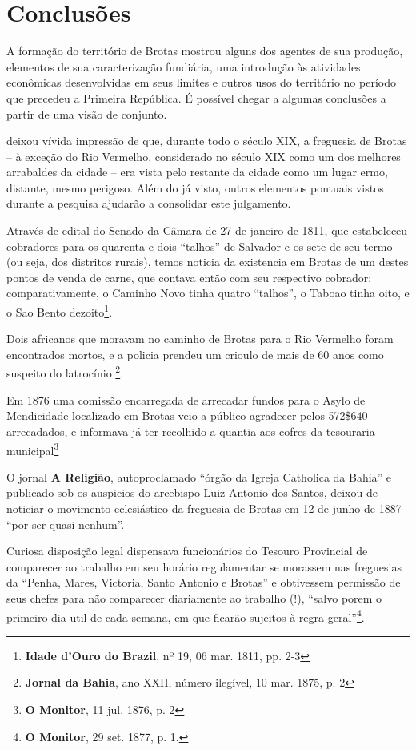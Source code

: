 \section{Conclusões}

A formação do território de Brotas mostrou alguns dos agentes de sua produção, elementos de sua caracterização fundiária, uma introdução às atividades econômicas desenvolvidas em seus limites e outros usos do território no período que precedeu a Primeira República. É possível chegar a algumas conclusões a partir de uma visão de conjunto.

deixou vívida impressão de que, durante todo o século XIX, a freguesia de Brotas -- à exceção do Rio Vermelho, considerado no século XIX como um dos melhores arrabaldes da cidade -- era vista pelo restante da cidade como um lugar ermo, distante, mesmo perigoso. Além do já visto, outros elementos pontuais vistos durante a pesquisa ajudarão a consolidar este julgamento.

Através de edital do Senado da Câmara de 27 de janeiro de 1811, que estabeleceu cobradores para os quarenta e dois ``talhos'' de Salvador e os sete de seu termo (ou seja, dos distritos rurais), temos noticia da existencia em Brotas de um destes pontos de venda de carne, que contava então com seu respectivo cobrador; comparativamente, o Caminho Novo tinha quatro ``talhos'', o Taboao tinha oito, e o Sao Bento dezoito\footnote{\textbf{Idade d'Ouro do Brazil}, nº 19, 06 mar. 1811, pp. 2-3}.

Dois africanos que moravam no caminho de Brotas para o Rio Vermelho foram encontrados mortos, e a policia prendeu um crioulo de mais de 60 anos como suspeito do latrocínio \footnote{\textbf{Jornal da Bahia}, ano XXII, número ilegível, 10 mar. 1875, p. 2}.

Em 1876 uma comissão encarregada de arrecadar fundos para o Asylo de Mendicidade localizado em Brotas veio a público agradecer pelos 572\$640 arrecadados, e informava já ter recolhido a quantia aos cofres da tesouraria municipal\footnote{\textbf{O Monitor}, 11 jul. 1876, p. 2}

O jornal \textbf{A Religião}, autoproclamado ``órgão da Igreja Catholica da Bahia'' e publicado sob os auspicios do arcebispo Luiz Antonio dos Santos, deixou de noticiar o movimento eclesiástico da freguesia de Brotas em 12 de junho de 1887 ``por ser quasi nenhum''.

Curiosa disposição legal dispensava funcionários do Tesouro Provincial de comparecer ao trabalho em seu horário regulamentar se morassem nas freguesias da ``Penha, Mares, Victoria, Santo Antonio e Brotas'' e obtivessem permissão de seus chefes para não comparecer diariamente ao trabalho (!), ``salvo porem o primeiro dia util de cada semana, em que ficarão sujeitos à regra geral''\footnote{\textbf{O Monitor}, 29 set. 1877, p. 1.}.

